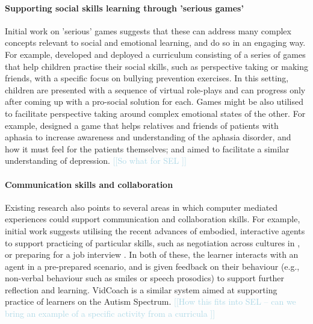 \documentclass[prodmode,acmtochi]{acmsmall}
\newcommand{\todo}[1]{\textrm{\textrm{\textcolor{LightBlue}{[[#1]]} } } }
\begin{document}
\paragraph{Supporting social skills learning through 'serious games'} Initial work on 'serious' games suggests that these can address many complex concepts relevant to social and emotional learning, and do so in an engaging way. 
For example,  developed and deployed a curriculum consisting of a series of games that help children practise their social skills, such as perspective taking or making friends, with a specific focus on bullying prevention exercises. In this setting, children are presented with a sequence of virtual role-plays and can progress only after coming up with a pro-social solution for each. 
%
Games might be also utilised to facilitate perspective taking around complex emotional states of the other. For example,  designed a game that helps relatives and friends of patients with aphasia to increase awareness and understanding of the aphasia disorder, and how it must feel for the patients themselves; and  aimed to facilitate a similar understanding of depression. \todo{So what for SEL }


\paragraph{Communication skills and collaboration} Existing research also points to several areas in which computer mediated experiences could support communication and collaboration skills. For example, initial work suggests utilising the recent advances of embodied, interactive agents to support practicing of particular skills, such as negotiation across cultures in \cite{Core2006}, or preparing for a job interview \cite{Hoque2013}. In both of these, the learner interacts with an agent in a pre-prepared scenario, and is given feedback on their behaviour (e.g., non-verbal behaviour such as smiles or speech prosodics) to support further reflection and learning. VidCoach is a similar system aimed at supporting practice of learners on the Autism Spectrum.
\todo{How this fits into SEL -- can we bring an example of a specific activity from a curricula }
\end{document}
